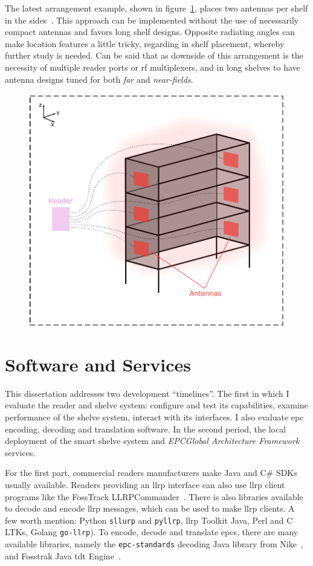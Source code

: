 The latest arrangement example, shown in figure~\ref{fig:position3}, places two antennas per shelf in the sides~\cite{markakisRFIDenabledLibraryManagement2013}. This approach can be implemented without the use of necessarily compact antennas and favors long shelf designs.
Opposite radiating angles can make location features a little tricky, regarding in shelf placement, whereby further study is needed.
Can be said that as downside of this arrangement is the necessity of multiple reader ports or \ac{rf} multiplexers, and in long shelves to have antenna designs tuned for both \emph{far} and \emph{near-fields}.

\begin{figure}[H]
    \centering
    \includegraphics[width=0.5\linewidth]{./figs/02-state-of-the-art/position3.pdf}
    \caption{} 
    \label{fig:position3}
\end{figure}

\section{Software and Services}

This dissertation addresses two development ``timelines''. The first in which I evaluate the reader and shelve system: configure and test its capabilities, examine performance of the shelve system, interact with its interfaces. I also evaluate \ac{epc} encoding, decoding and translation software.
In the second period, the local deployment of the smart shelve system and \emph{EPCGlobal Architecture Framework} services.

For the first part, commercial readers manufacturers make Java and C# SDKs usually available. Readers providing an \ac{llrp} interface can also use \ac{llrp} client programs like the FossTrack LLRPCommander~\cite{FosstrakLLRPCommander}. There is also libraries available to decode and encode \ac{llrp} messages, which can be used to make \ac{llrp} clients. A few worth mention: Python \texttt{sllurp} and \texttt{pyllrp}, \ac{llrp} Toolkit Java, Perl and C\+\+ LTKs\cite{LlrpOrga}, Golang \texttt{go-llrp}).
To encode, decode and translate \acp{epc}, there are many available libraries, namely the \texttt{epc-standards} decoding Java library from Nike~\cite{NikeIncEpcstandards2019}, and Fosstrak Java \ac{tdt} Engine~\cite{FosstrakTagData}.

